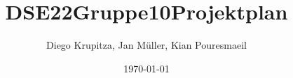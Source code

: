 \usepackage[utf8]{inputenc}
\usepackage[T1]{fontenc}

\usepackage[ngerman]{isodate, babel}
\usepackage[german=quotes]{csquotes}

\usepackage[hyphens]{url}
\usepackage[]{hyperref}
\hypersetup{colorlinks, citecolor=black, linkcolor=black, urlcolor=black}

\usepackage{titling}
\title{DSE22Gruppe10Projektplan}
\author{Diego Krupitza, Jan Müller, Kian Pouresmaeil}
\date{\today}

\usepackage{fancyhdr}
\pagestyle{fancy}
\fancyhead{} %
\renewcommand{\headrulewidth}{0pt} %
\fancyfoot{} %
\fancyfoot[LE,RO]{\thepage} %
\fancyfoot[RE,LO]{\thetitle}
